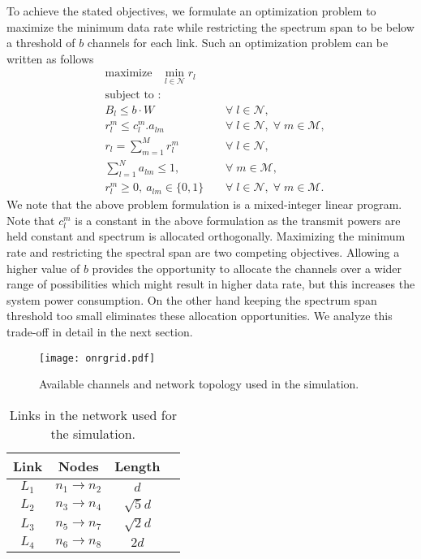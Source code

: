 \documentclass[conference]{IEEEtran}
\begin{document}
To achieve the stated objectives, we formulate an optimization problem to maximize the minimum data rate while restricting the spectrum span to be below a threshold of $b$ channels for each link. Such an optimization problem can be written as follows
\begin{equation*}
\begin{aligned}
&{\text{maximize}}\;\;\; \min_{l\in \mathcal{N}}{r_l} \\
&\text{subject to :}\\
& B_l\leq b\cdot W\;\;\;\;&\forall \; l\in \mathcal{N},\\
&r_l^m \leq c_l^m . a_{lm} \;\;\;\;&\forall \; l\in \mathcal{N},\;\forall\; m \in \mathcal{M},\\
&r_l = \sum_{m=1}^M r_{l}^m \;\;\; &\forall\; l \in \mathcal{N},\\
&\sum_{l=1}^N a_{lm} \leq 1,\;\;\; &\forall\; m \in \mathcal{M},\\
&r_l^m \geq 0,\ a_{lm}\in \{0,1\}\;\;\;\;&\forall \; l\in \mathcal{N},\;\forall\; m \in \mathcal{M}.
\end{aligned}
\end{equation*}
We note that the above problem formulation is a mixed-integer linear program. Note that $c_l^m$ is a constant in the above formulation as the transmit powers are held constant and spectrum is allocated orthogonally. Maximizing the minimum rate and restricting the spectral span are two competing objectives. Allowing a higher value of $b$ provides the opportunity to allocate the channels over a wider range of possibilities which might result in higher data rate, but this increases  the system power consumption. On the other hand keeping the spectrum span threshold too small eliminates these allocation opportunities. We analyze this trade-off in detail in the next section. 



\begin{figure}[!t]
  \centering
    \texttt{[image: onrgrid.pdf]}
    \caption{Available channels and network topology used in the simulation.}
  \label{fig:toposim}
\end{figure}


\begin{table}[t]
\centering
\begin{tabular}{ c|c|c c } 
\hline
Link & Nodes & Length \\
\hline
$L_1$ & $n_1 \rightarrow n_2$ & $d$\\ 
$L_2$ & $n_3 \rightarrow n_4$ & $\sqrt{5}d$\\ 
$L_3$ & $n_5 \rightarrow n_7$ & $\sqrt{2}d$\\ 
$L_4$ & $n_6 \rightarrow n_8$ & $2d$\\ 
\hline
\end{tabular}
\caption{Links in the network used for the simulation.}
\label{table:link}
\end{table}
\end{document}
